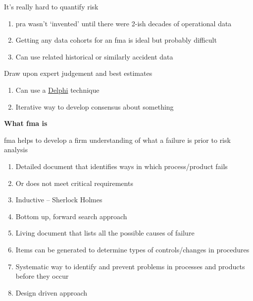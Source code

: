 \documentclass[aspectratio=1610,pdftex,dvipsnames,compress,xcolor={dvipsnames}]{beamer}
\newcommand{\acs}{\acrshort} %
\begin{document}
\begin{frame}{It's really hard to quantify risk}
    \begin{enumerate}[series=outerlist,topsep=0pt,itemsep=21pt,leftmargin=*,label=(\arabic*)]
        \item[]\acs{pra} wasn't `invented' until there were 2-ish decades of operational data
        \item[]Getting any data cohorts for an \acs{fma} is ideal but probably difficult 
        \item[]Can use related historical or similarly accident data
    \end{enumerate}
\end{frame}


\begin{frame}{Draw upon expert judgement and best estimates}
    \begin{enumerate}[series=outerlist,topsep=0pt,itemsep=21pt,leftmargin=*,label=(\arabic*)]
        \item[]Can use a \href{https://uidaho.pressbooks.pub/riskassessment/chapter/failure-rates/}{Delphi} technique
        \item[]Iterative way to develop consensus about something
    \end{enumerate}
\end{frame}


\begin{frame}[plain]{}
    \centering\LARGE\textbf{What \acs{fma} is}
\end{frame}


\addtocounter{framenumber}{-1}
\begin{frame}{\acs{fma} helps to develop a firm understanding of what a failure is prior to risk analysis}
    \begin{enumerate}[series=outerlist,topsep=0pt,itemsep=11pt,leftmargin=*,label=(\arabic*)]
        \item[]Detailed document that identifies ways in which process/product fails
        \item[]Or does not meet critical requirements
        \item[]Inductive -- Sherlock Holmes  
        \item[]Bottom up, forward search approach
        \item[]Living document that lists all the possible causes of failure
        \item[]Items can be generated to determine types of controls/changes in procedures 
        \item[]Systematic way to identify and prevent problems in processes and products before they occur  
        \item[]Design driven approach
    \end{enumerate}
\end{frame}
\end{document}
